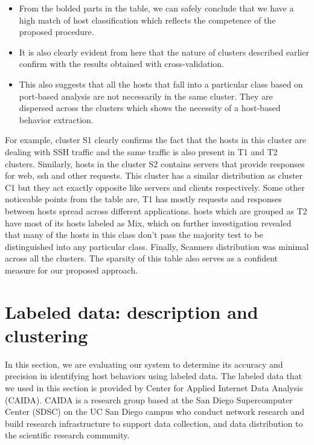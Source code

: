 \begin{itemize}
	\item From the bolded parts in the table, we can safely conclude that we have a high match of host classification which reflects the competence of the proposed procedure.
	
	\item  It is also clearly evident from here that the nature of clusters described earlier confirm with the results obtained with cross-validation.
	
	\item This also suggests that all the hosts that fall into a particular class based on port-based analysis are not necessarily in the same cluster. They are dispersed across the clusters which shows the necessity of a host-based behavior extraction.	
\end{itemize}
  For example, cluster S1 clearly confirms the fact that the hosts in this cluster are dealing with SSH traffic and the same traffic is also present in T1 and T2 clusters. Similarly, hosts in the cluster S2 contains servers that provide responses for web, ssh and other requests. This cluster has a similar distribution as cluster C1 but they act exactly opposite like servers and clients respectively. Some other noticeable points from the table are, T1 has mostly requests and responses between hosts spread across different applications. hosts which are grouped as T2 have most of its hosts labeled as Mix, which on further investigation revealed that many of the hosts in this class don't pass the majority test to be distinguished into any particular class. Finally, Scanners distribution was minimal across all the clusters. The sparsity of this table also serves as a confident measure for our proposed approach.

\section{Labeled data: description and clustering}

In this section, we are evaluating our system to determine its accuracy and precision in identifying host behaviors using labeled data. The labeled data that we used in this section is provided by Center for Applied Internet Data Analysis (CAIDA). CAIDA is a research group based at the San Diego Supercomputer Center (SDSC) on the UC San Diego campus who conduct network research and build research infrastructure to support data collection, and data distribution to the scientific research community.

